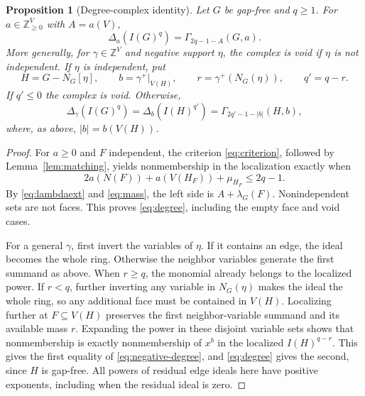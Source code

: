 \documentclass[11pt,a4paper]{article}
\newtheorem{proposition}[theorem]{Proposition}
\theoremstyle{definition}
\newcommand{\ZZ}{\mathbb Z}
\newcommand{\NN}{\mathbb Z_{\geq 0}}
\newcommand{\G}{\Gamma}
\begin{document}
\begin{proposition}[Degree-complex identity]\label{prop:degree}
Let $G$ be gap-free and $q\geq1$. For $a\in\NN^V$ with $A=a(V)$,
\begin{equation}\label{eq:degree}
 \Delta_a(I(G)^q)=\G_{2q-1-A}(G,a).
\end{equation}
More generally, for $\gamma\in\ZZ^V$ and negative support $\eta$, the complex is void if $\eta$ is not independent. If $\eta$ is independent, put
\[
 H=G-N_G[\eta],\qquad b=\gamma^+|_{V(H)},\qquad
 r=\gamma^+(N_G(\eta)),\qquad q'=q-r.
\]
If $q'\leq0$ the complex is void. Otherwise,
\begin{equation}\label{eq:negative-degree}
 \Delta_\gamma(I(G)^q)=\Delta_b(I(H)^{q'})=\G_{2q'-1-|b|}(H,b),
\end{equation}
where, as above, $|b|=b(V(H))$.
\end{proposition}
\begin{proof}
For $a\geq0$ and $F$ independent, the criterion \eqref{eq:criterion}, followed by Lemma~\ref{lem:matching}, yields nonmembership in the localization exactly when
\[
 2a(N(F))+a(V(H_F))+\mu_{H_F}\leq2q-1.
\]
By \eqref{eq:lambdaext} and \eqref{eq:mass}, the left side is $A+\lambda_G(F)$. Nonindependent sets are not faces. This proves \eqref{eq:degree}, including the empty face and void cases.

For a general $\gamma$, first invert the variables of $\eta$. If it contains an edge, the ideal becomes the whole ring. Otherwise the neighbor variables generate the first summand as above. When $r\geq q$, the monomial already belongs to the localized power. If $r<q$, further inverting any variable in $N_G(\eta)$ makes the ideal the whole ring, so any additional face must be contained in $V(H)$. Localizing further at $F\subseteq V(H)$ preserves the first neighbor-variable summand and its available mass $r$. Expanding the power in these disjoint variable sets shows that nonmembership is exactly nonmembership of $x^b$ in the localized $I(H)^{q-r}$. This gives the first equality of \eqref{eq:negative-degree}, and \eqref{eq:degree} gives the second, since $H$ is gap-free. All powers of residual edge ideals here have positive exponents, including when the residual ideal is zero.
\end{proof}
\end{document}

